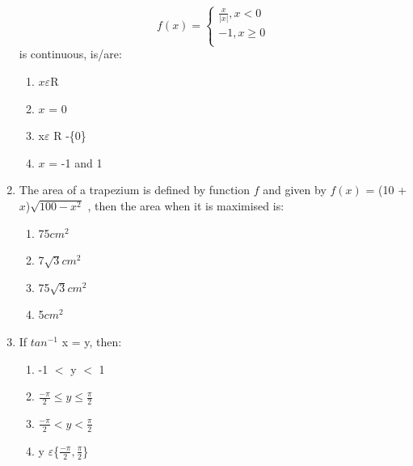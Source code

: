 \documentclass{article}
\begin{document}
\begin{enumerate}
\[
f(x) = \begin{cases}
\frac{x}{|x|}, x < 0 \\
-1 , x \geq 0 \\
\end{cases}
\]
is continuous, is/are:
\begin{enumerate}
     \item $x\varepsilon$R 
     \item $x$ = 0
     \item x$\varepsilon$ R -\{0\} 
     \item $x$ = -1 and 1 
\end{enumerate}

\item The area of a trapezium is defined by function $f$ and given by $f(x)$ = (10 + $x$)$\sqrt{100-x^2}$
, then the area when it is maximised is: 
\begin{enumerate}
    \item 75$cm^2$
    \item 7$\sqrt{3}$$cm^2$
    \item 75$\sqrt{3}$$cm^2$
    \item 5$cm^2$
\end{enumerate}

\item If $tan^{-1}$ x = y, then: 
\begin{enumerate}
    \item -1 $<$ y $<$ 1
    \item $\frac{-\pi}{2} \leq y \leq \frac{\pi}{2}$
    \item $\frac{-\pi}{2} < y < \frac{\pi}{2}$
    \item y $\varepsilon$\{$\frac{-\pi}{2},\frac{\pi}{2}$\}
\end{enumerate}


\end{enumerate}
\end{document}
